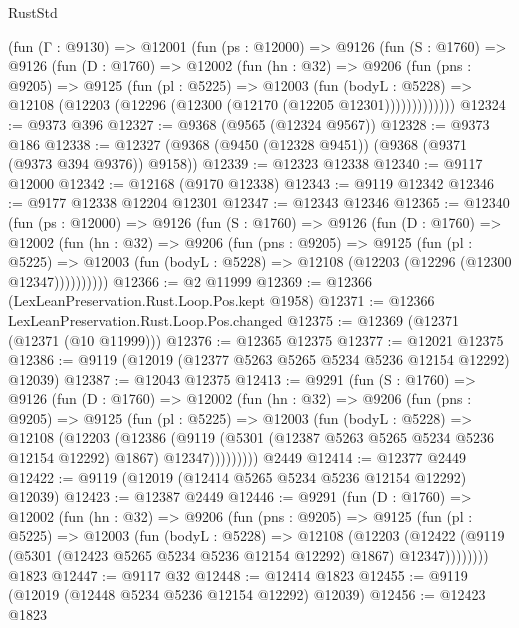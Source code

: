 \begin{lexlean}{RustStd}
\begin{coremodule}
    (fun (Γ : @9130) =>
    @12001
      (fun (ps : @12000) =>
      @9126
        (fun (S : @1760) =>
        @9126
          (fun (D : @1760) =>
          @12002
            (fun (hn : @32) =>
            @9206
              (fun (pns : @9205) =>
              @9125
                (fun (pl : @5225) =>
                @12003
                  (fun (bodyL : @5228) =>
                  @12108 (@12203 (@12296 (@12300 (@12170 (@12205 @12301)))))))))))))
@12324 := @9373 @396
@12327 := @9368 (@9565 (@12324 @9567))
@12328 := @9373 @186
@12338 := @12327 (@9368 (@9450 (@12328 @9451)) (@9368 (@9371 (@9373 @394 @9376)) @9158))
@12339 := @12323 @12338
@12340 := @9117 @12000
@12342 := @12168 (@9170 @12338)
@12343 := @9119 @12342
@12346 := @9177 @12338 @12204 @12301
@12347 := @12343 @12346
@12365 := @12340
    (fun (ps : @12000) =>
    @9126
      (fun (S : @1760) =>
      @9126
        (fun (D : @1760) =>
        @12002
          (fun (hn : @32) =>
          @9206
            (fun (pns : @9205) =>
            @9125
              (fun (pl : @5225) =>
              @12003 (fun (bodyL : @5228) => @12108 (@12203 (@12296 (@12300 @12347))))))))))
@12366 := @2 @11999
@12369 := @12366 (LexLeanPreservation.Rust.Loop.Pos.kept @1958)
@12371 := @12366 LexLeanPreservation.Rust.Loop.Pos.changed
@12375 := @12369 (@12371 (@12371 (@10 @11999)))
@12376 := @12365 @12375
@12377 := @12021 @12375
@12386 := @9119 (@12019 (@12377 @5263 @5265 @5234 @5236 @12154 @12292) @12039)
@12387 := @12043 @12375
@12413 := @9291
    (fun (S : @1760) =>
    @9126
      (fun (D : @1760) =>
      @12002
        (fun (hn : @32) =>
        @9206
          (fun (pns : @9205) =>
          @9125
            (fun (pl : @5225) =>
            @12003
              (fun (bodyL : @5228) =>
              @12108
                (@12203
                  (@12386
                    (@9119
                      (@5301 (@12387 @5263 @5265 @5234 @5236 @12154 @12292) @1867)
                      @12347)))))))))
    @2449
@12414 := @12377 @2449
@12422 := @9119 (@12019 (@12414 @5265 @5234 @5236 @12154 @12292) @12039)
@12423 := @12387 @2449
@12446 := @9291
    (fun (D : @1760) =>
    @12002
      (fun (hn : @32) =>
      @9206
        (fun (pns : @9205) =>
        @9125
          (fun (pl : @5225) =>
          @12003
            (fun (bodyL : @5228) =>
            @12108
              (@12203
                (@12422 (@9119 (@5301 (@12423 @5265 @5234 @5236 @12154 @12292) @1867) @12347))))))))
    @1823
@12447 := @9117 @32
@12448 := @12414 @1823
@12455 := @9119 (@12019 (@12448 @5234 @5236 @12154 @12292) @12039)
@12456 := @12423 @1823

\end{coremodule}
\end{lexlean}
